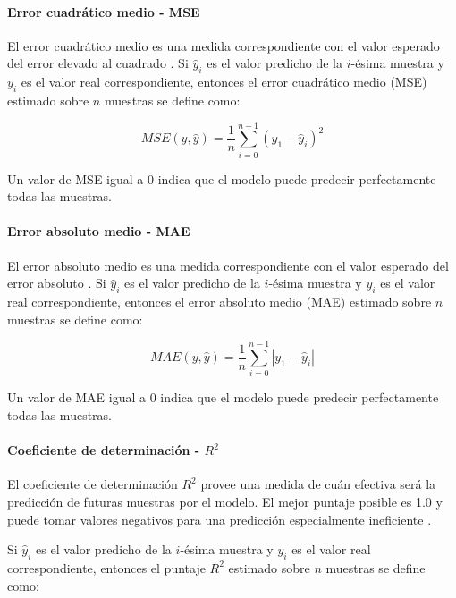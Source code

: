         \paragraph{Error cuadrático medio - MSE}
        El error cuadrático medio es una medida correspondiente con el valor esperado del error elevado al cuadrado \cite{mse}. Si $\hat{y}_i$ 
        es el valor predicho de la $i$-ésima muestra y $y_i$ es el valor real correspondiente, entonces el error 
        cuadrático medio (MSE) estimado sobre $n$ muestras se define como:
        
        \begin{equation}\label{eq:mse}
            MSE(y,\hat{y}) = \frac{1}{n} \sum_{i=0}^{n-1} (y_1 - \hat{y}_i)^2
        \end{equation}

        Un valor de MSE igual a $0$ indica que el modelo puede predecir perfectamente todas las muestras.

        \paragraph{Error absoluto medio - MAE}

        El error absoluto medio es una medida correspondiente con el valor esperado del error absoluto \cite{mae}. Si $\hat{y}_i$ 
        es el valor predicho de la $i$-ésima muestra y $y_i$ es el valor real correspondiente, entonces el error 
        absoluto medio (MAE) estimado sobre $n$ muestras se define como:
        
        \begin{equation}\label{eq:mae}
            MAE(y,\hat{y}) = \frac{1}{n} \sum_{i=0}^{n-1} |y_1 - \hat{y}_i|
        \end{equation}

        Un valor de MAE igual a $0$ indica que el modelo puede predecir perfectamente todas las muestras.

        \paragraph{Coeficiente de determinación - $R^2$}
        El coeficiente de determinación $R^2$ provee una medida de cuán efectiva será la predicción de futuras muestras 
        por el modelo. El mejor puntaje posible es 1.0 y puede tomar valores negativos para una predicción especialmente 
        ineficiente \cite{r2}. 

        Si $\hat{y}_i$ es el valor predicho de la $i$-ésima muestra y $y_i$ es el valor real correspondiente, entonces el puntaje
        $R^2$ estimado sobre $n$ muestras se define como:
        
